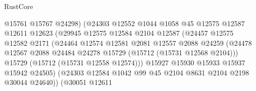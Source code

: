 \begin{lexlean}{RustCore}
\begin{coremodule}
                                    @15761
                                    @15767
                                    @24298)
                                  (@24303
                                    @12552
                                    @1044
                                    @1058
                                    @45
                                    @12575
                                    @12587
                                    @12611
                                    @12623
                                    (@29945
                                      @12575
                                      @12584
                                      @2104
                                      @12587
                                      (@24457
                                        @12575
                                        @12582
                                        @2171
                                        (@24464
                                          @12574
                                          @12581
                                          @2081
                                          @12557
                                          @2088
                                          @24259
                                          (@24478
                                            @12567
                                            @2088
                                            @24484
                                            @24278
                                            @15729
                                            (@15712 (@15731 @12568 @2104)))
                                          @15729
                                          (@15712 (@15731 @12558 @12574)))
                                        @15927
                                        @15930
                                        @15933
                                        @15937
                                        @15942
                                        @24505)
                                      (@24303
                                        @12584
                                        @1042
                                        @99
                                        @45
                                        @2104
                                        @8631
                                        @2104
                                        @2198
                                        @30044
                                        @24640))
                                    (@30051
                                      @12611

\end{coremodule}
\end{lexlean}
